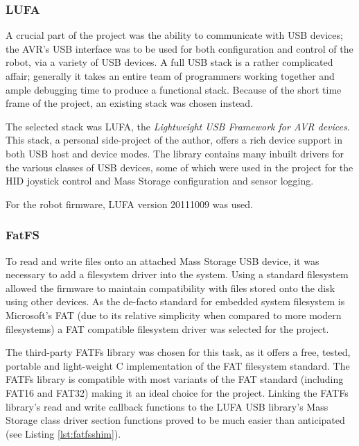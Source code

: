 \FloatBarrier
\subsubsection{LUFA}

A crucial part of the project was the ability to communicate with USB devices; the AVR's USB interface was to be used for both configuration and control of the robot, via a variety of USB devices. A full USB stack is a rather complicated affair; generally it takes an entire team of programmers working together and ample debugging time to produce a functional stack. Because of the short time frame of the project, an existing stack was chosen instead.

The selected stack was LUFA, the \textit{Lightweight USB Framework for AVR devices}. This stack, a personal side-project of the author, offers a rich device support in both USB host and device modes. The library contains many inbuilt drivers for the various classes of USB devices, some of which were used in the project for the HID joystick control and Mass Storage configuration and sensor logging.

For the robot firmware, LUFA version 20111009 was used.

\FloatBarrier
\subsubsection{FatFS}

To read and write files onto an attached Mass Storage USB device, it was necessary to add a filesystem driver into the system. Using a standard filesystem allowed the firmware to maintain compatibility with files stored onto the disk using other devices. As the de-facto standard for embedded system filesystem is Microsoft's FAT (due to its relative simplicity when compared to more modern filesystems) a FAT compatible filesystem driver was selected for the project.

The third-party FATFs library was chosen for this task, as it offers a free, tested, portable and light-weight C implementation of the FAT filesystem standard. The FATFs library is compatible with most variants of the FAT standard (including FAT16 and FAT32) making it an ideal choice for the project. Linking the FATFs library's read and write callback functions to the LUFA USB library's Mass Storage class driver section functions proved to be much easier than anticipated (see Listing \ref{lst:fatfsshim}).



